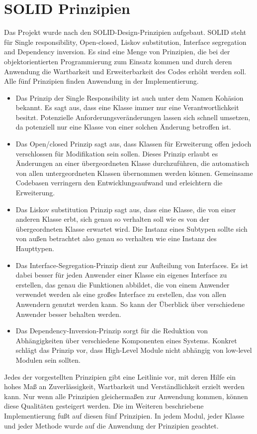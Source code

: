 \section{SOLID Prinzipien}

Das Projekt wurde nach den SOLID-Design-Prinzipien \cite{unclebob1995} aufgebaut. SOLID steht für Single responsibility, Open-closed, Liskov substitution, Interface segregation and Dependency inversion. Es sind  eine Menge von Prinzipien, die bei der objektorientierten Programmierung zum Einsatz kommen und durch deren Anwendung die Wartbarkeit und Erweiterbarkeit des Codes erhöht werden soll. Alle fünf Prinzipien finden Anwendung in der Implementierung.

\begin{itemize}
\item Das Prinzip der Single Responsibility  ist auch unter dem Namen Kohäsion bekannt. Es sagt aus, dass eine Klasse immer nur eine Verantwortlichkeit besitzt.  Potenzielle Anforderungsveränderungen lassen sich schnell umsetzen, da potenziell nur eine Klasse von einer solchen Änderung betroffen ist.

\item Das Open/closed Prinzip sagt aus, dass Klassen für Erweiterung offen jedoch verschlossen für Modifikation sein sollen. Dieses Prinzip erlaubt es Änderungen an einer übergeordneten Klasse durchzuführen, die automatisch von allen untergeordneten Klassen übernommen werden können. Gemeinsame Codebasen verringern den Entwicklungsaufwand und erleichtern die Erweiterung.

\item Das Liskov substitution Prinzip sagt aus, dass eine Klasse, die von einer anderen Klasse erbt, sich genau so verhalten soll wie es von der übergeordneten Klasse erwartet wird. Die Instanz eines Subtypen sollte sich von außen betrachtet also genau so verhalten wie eine Instanz des Haupttypen.

\item Das Interface-Segregation-Prinzip dient zur Aufteilung von Interfaces. Es ist dabei besser für jeden Anwender einer Klasse ein eigenes Interface zu erstellen, das genau die Funktionen abbildet, die von einem Anwender verwendet werden als eine großes Interface zu erstellen, das von allen Anwendern genutzt werden kann. So kann der Überblick über verschiedene Anwender besser behalten werden.

\item Das Dependency-Inversion-Prinzip sorgt für die Reduktion von Abhängigkeiten über verschiedene Komponenten eines Systems. Konkret schlägt das Prinzip vor, dass High-Level Module nicht abhängig von low-level Modulen sein sollten.

\end{itemize}

Jedes der vorgestellten Prinzipien gibt eine Leitlinie vor, mit deren Hilfe ein hohes Maß an Zuverlässigkeit, Wartbarkeit und Verständlichkeit erzielt werden kann. Nur wenn alle Prinzipien gleichermaßen zur Anwendung kommen, können diese Qualitäten gesteigert werden. Die im Weiteren beschriebene Implementierung fußt auf diesen fünf Prinzipien. In jedem Modul, jeder Klasse und jeder Methode wurde auf die Anwendung der Prinzipien geachtet.